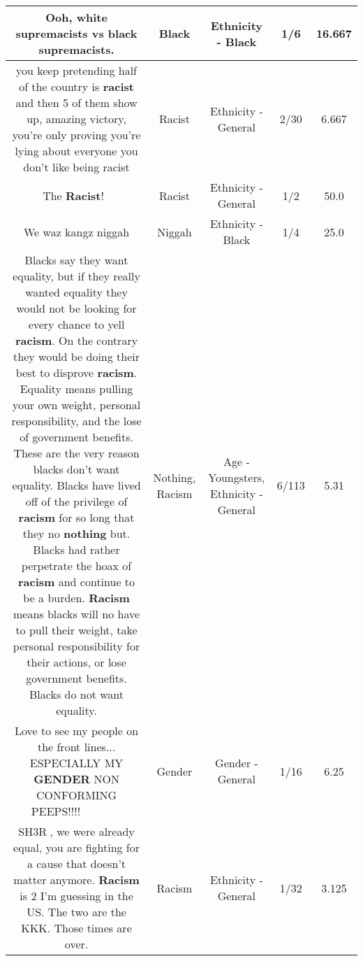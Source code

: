 \documentclass[11pt]{article}
\newlength\mylength
\begin{document}
\begin{center}
\begin{longtable}{|C{.65\mylength}|C{.30\mylength}|C{.12\mylength}|C{.12\mylength}|C{.12\mylength}|}
  \small Ooh, white supremacists vs \textbf{black} supremacists.\normalsize   & Black & Ethnicity - Black & 1/6 & 16.667 \\  \hline
  \small you keep pretending half of the country is \textbf{racist} and then 5 of them show up, amazing victory, you're only proving you're lying about everyone you don't like being racist\normalsize   & Racist & Ethnicity - General & 2/30 & 6.667 \\  \hline
  \small The \textbf{Racist}!👎🏻\normalsize   & Racist & Ethnicity - General & 1/2 & 50.0 \\  \hline
  \small We waz kangz niggah\normalsize   & Niggah & Ethnicity - Black & 1/4 & 25.0 \\  \hline
  \small Blacks say they want equality, but if they really wanted equality they would not be looking for every chance to yell \textbf{racism}. On the contrary they would be doing their best to disprove \textbf{racism}. Equality means pulling your own weight,  personal responsibility,  and the lose of government benefits. These are the very reason blacks don't want equality. Blacks have lived off of the privilege of \textbf{racism} for so long that they no \textbf{nothing} but. Blacks had rather perpetrate the hoax of \textbf{racism} and continue to be a burden. \textbf{Racism} means blacks will no have to pull their weight, take personal responsibility for their actions, or lose government benefits. Blacks do not want equality.\normalsize   & Nothing, Racism & Age - Youngsters, Ethnicity - General & 6/113 & 5.31 \\  \hline
  \small Love to see my people on the front lines... ESPECIALLY MY \textbf{GENDER} NON CONFORMING PEEPS!!!! ✊🏾✊🏾✊🏾✊🏾✊🏾✊🏾\normalsize   & Gender & Gender - General & 1/16 & 6.25 \\  \hline
  \small SH3R🐻, we were already equal, you are fighting for a cause that doesn't matter anymore. \textbf{Racism} is 2 I'm guessing in the US. The two are the KKK. Those times are over.\normalsize   & Racism & Ethnicity - General & 1/32 & 3.125 \\  \hline

\end{longtable}
\end{center}
\end{document}

